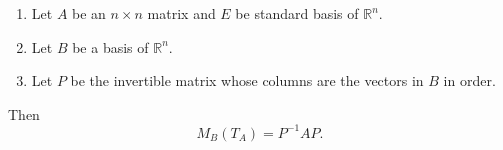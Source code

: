 \documentclass[20pt,a4paper]{extarticle}
\newcounter{theorem}
\begin{document}
\newpage 

\phantom{2}

\vfill 

\begin{theorem}
	\begin{enumerate}[label=\Circled{\arabic*}]
		\item Let $A$ be an $n \times n$ matrix and $E$ be standard basis of $\mathbb{R}^n$. 
		\item Let $B$ be a basis of $\mathbb{R}^n$.
		\item Let $P$ be the invertible matrix whose columns are the vectors in $B$ in order.
	\end{enumerate}
Then
	\[
		M_B (T_A) = P^{-1} A P .
	\]
\end{theorem}
\end{document}
